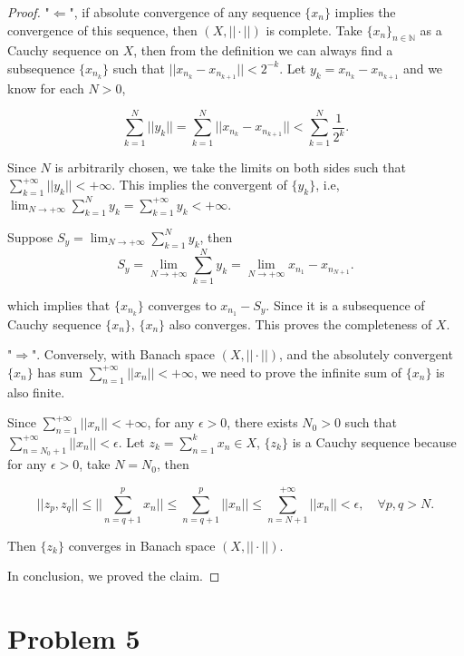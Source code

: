 \documentclass[12pt]{article}
\begin{document}
\begin{proof}

"$\Leftarrow$", if absolute convergence of any sequence $\{x_n\}$ implies the convergence of this sequence, then $(X, ||\cdot||)$ is complete. Take $\{x_n\}_{n\in\mathbb N}$ as a Cauchy sequence on $X$, then from the definition we can always find a subsequence  $\{x_{n_k}\}$ such that $||x_{n_k} - x_{n_{k+1}}|| < 2^{-k}$. Let $y_k = x_{n_k} - x_{n_{k+1}}$ and we know for each $N>0$, 

$$
\sum_{k=1}^N ||y_k|| = \sum_{k=1}^N ||x_{n_k} - x_{n_{k+1}}|| <  \sum_{k=1}^N \frac{1}{2^k}.
$$

Since $N$ is arbitrarily chosen, we take the limits on both sides such that $\sum_{k=1}^{+\infty} ||y_k|| < +\infty$. This implies the convergent of $\{y_k\}$, i.e, $\lim_{N\rightarrow +\infty} \sum_{k=1}^N y_k = \sum_{k=1}^{+\infty} y_k < +\infty$.

Suppose $S_y = \lim_{N\rightarrow +\infty} \sum_{k=1}^N y_k$, then 
$$
S_y = \lim_{N\rightarrow +\infty} \sum_{k=1}^N y_k =\lim_{N\rightarrow +\infty} x_{n_1} - x_{n_{N+1}}.
$$

which implies that $\{x_{n_k}\}$ converges to $x_{n_1} - S_y$. Since it is a subsequence of Cauchy sequence $\{x_n\}$, $\{x_n\}$ also converges. This proves the completeness of $X$.

\vspace{15mm}

"$\Rightarrow$". Conversely, with Banach space $(X, ||\cdot||)$, and the absolutely convergent $\{x_n\}$ has sum $\sum_{n=1}^{+\infty} ||x_n|| < +\infty$, we need to prove the infinite sum of $\{x_n\}$ is also finite.

Since $\sum_{n=1}^{+\infty} ||x_n|| < +\infty$, for any $\epsilon > 0$, there exists $N_0>0$ such that $\sum_{n=N_0 + 1}^{+\infty} ||x_n|| < \epsilon$. Let $z_k = \sum_{n=1}^{k} x_n \in X$, $\{z_k\}$ is a Cauchy sequence because for any $\epsilon > 0$, take $N = N_0$, then

$$
||z_p, z_q|| \leqslant ||\sum_{n=q+1}^p x_n|| \leqslant \sum_{n=q+1}^p||x_n|| \leqslant \sum_{n=N+1}^{+\infty}||x_n|| < \epsilon, \quad \forall p, q > N.
$$

Then $\{z_k\}$ converges in Banach space $(X, ||\cdot||)$. 

In conclusion, we proved the claim.

\end{proof}


\section*{Problem 5}
\end{document}
